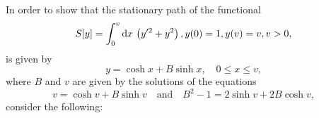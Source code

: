 \begin{question}
In order to show that the stationary path of the functional
\[
	S[y] = \int_{0}^{v}\mathrm{d} x\,\left(y^{\prime 2} + y^2\right), y(0) = 1, y(v) = v, v > 0,
\]
is given by
\[
y = \cosh x + B \sinh x, \quad 0 \leq x \leq v,
\]
where $B$ and $v$ are given by the solutions of the equations
\[
	v = \cosh v + B \sinh v \quad\text{and}\quad B^2 - 1 = 2 \sinh v + 2B \cosh v,
\]
consider the following:
\qpart %

\qpart %

\qpart %

\end{question}